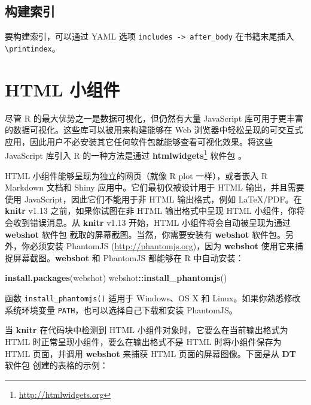 \documentclass[
  12pt,
]{krantz}
\newenvironment{Shaded}{\begin{snugshade}}{\end{snugshade}}
\newcommand{\FunctionTok}[1]{\textcolor[rgb]{0.13,0.29,0.53}{\textbf{#1}}}
\newcommand{\NormalTok}[1]{#1}
\newcommand{\SpecialCharTok}[1]{\textcolor[rgb]{0.81,0.36,0.00}{\textbf{#1}}}
\newcommand{\StringTok}[1]{\textcolor[rgb]{0.31,0.60,0.02}{#1}}
\renewcommand{\href}[2]{#2\footnote{\url{#1}}}
\theoremstyle{definition}
\theoremstyle{definition}
\theoremstyle{definition}
\theoremstyle{definition}
\theoremstyle{remark}
\begin{document}
\subsection{构建索引}\label{ux6784ux5efaux7d22ux5f15}

要构建索引，可以通过 YAML 选项 \texttt{includes\ -\textgreater{}\ after\_body} 在书籍末尾插入 \texttt{\textbackslash{}printindex}。

\section{HTML 小组件}\label{html-ux5c0fux7ec4ux4ef6}

尽管 R 的最大优势之一是数据可视化，但仍然有大量 JavaScript 库可用于更丰富的数据可视化。这些库可以被用来构建能够在 Web 浏览器中轻松呈现的可交互式应用，因此用户不必安装其它任何软件包就能够查看可视化效果。将这些 JavaScript 库引入 R 的一种方法是通过 \href{http://htmlwidgets.org}{\textbf{htmlwidgets}} 软件包 \citep{R-htmlwidgets}。

HTML 小组件能够呈现为独立的网页（就像 R plot 一样），或者嵌入 R Markdown 文档和 Shiny 应用中。它们最初仅被设计用于 HTML 输出，并且需要使用 JavaScript，因此它们不能用于非 HTML 输出格式，例如 LaTeX/PDF。在 \textbf{knitr} v1.13 之前，如果你试图在非 HTML 输出格式中呈现 HTML 小组件，你将会收到错误消息。从 \textbf{knitr} v1.13 开始，HTML 小组件将会自动被呈现为通过 \textbf{webshot} 软件包 \citep{R-webshot} 截取的屏幕截图。当然，你需要安装有 \textbf{webshot} 软件包。另外，你必须安装 PhantomJS (\url{http://phantomjs.org})，因为 \textbf{webshot} 使用它来捕捉屏幕截图。\textbf{webshot} 和 PhantomJS 都能够在 R 中自动安装：

\begin{Shaded}
\begin{Highlighting}[]
\FunctionTok{install.packages}\NormalTok{(}\StringTok{\textquotesingle{}webshot\textquotesingle{}}\NormalTok{)}
\NormalTok{webshot}\SpecialCharTok{::}\FunctionTok{install\_phantomjs}\NormalTok{()}
\end{Highlighting}
\end{Shaded}

函数 \texttt{install\_phantomjs()} 适用于 Windows、OS X 和 Linux。如果你熟悉修改系统环境变量 \texttt{PATH}，也可以选择自己下载和安装 PhantomJS。

当 \textbf{knitr} 在代码块中检测到 HTML 小组件对象时，它要么在当前输出格式为 HTML 时正常呈现小组件，要么在输出格式不是 HTML 时将小组件保存为 HTML 页面，并调用 \textbf{webshot} 来捕获 HTML 页面的屏幕图像。下面是从 \textbf{DT} 软件包 \citep{R-DT} 创建的表格的示例：
\end{document}
